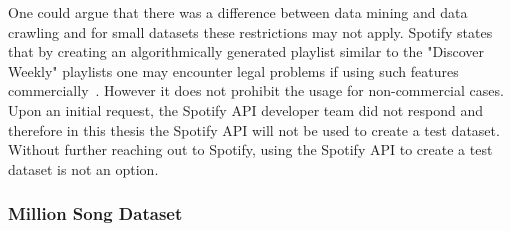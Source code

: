 One could argue that there was a difference between data mining and data crawling and for small datasets these restrictions may not apply.
Spotify states that by creating an algorithmically generated playlist similar to the "Discover Weekly" playlists one may encounter legal problems if using such features commercially~\cite{spottac3}. However it does not prohibit the usage for non-commercial cases.\\ 
Upon an initial request, the Spotify API developer team did not respond and therefore in this thesis the Spotify API will not be used to create a test dataset. Without further reaching out to Spotify, using the Spotify API to create a test dataset is not an option. 

\subsubsection{Million Song Dataset}

